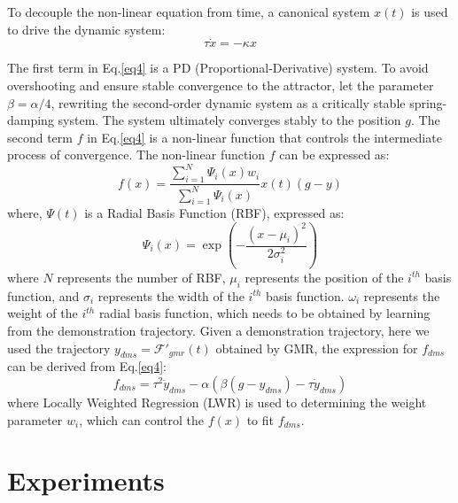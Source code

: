 \documentclass[conference]{IEEEtran}
\begin{document}
To decouple the non-linear equation from time, a canonical system $x(t)$ is used to drive the dynamic system:
\begin{equation}
    \tau \dot x = - \kappa x
\end{equation}

The first term in Eq.\ref{eq4} is a PD (Proportional-Derivative) system. To avoid overshooting and ensure stable convergence to the attractor, let the parameter $\beta = \alpha / 4$, rewriting the second-order dynamic system as a critically stable spring-damping system. The system ultimately converges stably to the position $g$. The second term $f$ in Eq.\ref{eq4} is a non-linear function that controls the intermediate process of convergence. The non-linear function $f$ can be expressed as:
\begin{equation}
    f(x)=\frac{\sum\limits_{i=1}^{N} \Psi_{i}(x) w_{i}}{\sum\limits_{i=1}^{N} \Psi_{i}(x)}x(t)(g-y)
    \label{eq5}
\end{equation}
where, $\Psi(t)$ is a Radial Basis Function (RBF), expressed as:
\begin{equation}
    \Psi_i(x)= \exp \left(-\frac{\left(x-\mu_i \right)^{2}}{2 \sigma_i^{2}}\right)
\end{equation}
where $N$ represents the number of RBF, $\mu_i$ represents the position of the $i^{th}$ basis function, and $\sigma_i$ represents the width of the $i^{th}$ basis function. $\omega_i$ represents the weight of the $i^{th}$ radial basis function, which needs to be obtained by learning from the demonstration trajectory. Given a demonstration trajectory, here we used the trajectory $y_{dms}=\mathcal{F}' _{gmr}(t)$ obtained by GMR, the expression for $f_{dms}$ can be derived from Eq.\ref{eq4}:
\begin{equation}
    f_{dms} = \tau^2 \ddot y_{dms} - \alpha(\beta (g-y_{dms})-\tau \dot y_{dms})
    \label{eq6}
\end{equation}
where Locally Weighted Regression (LWR) is used to determining the weight parameter $w_{i}$, which can control the $f(x)$ to fit $f_{dms}$.

\section{Experiments}
\end{document}
